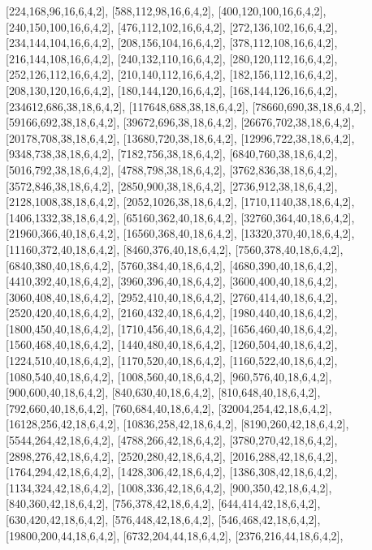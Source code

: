 \documentclass[12pt]{amsart}
\begin{document}
[224,168,96,16,6,4,2],   [588,112,98,16,6,4,2],   [400,120,100,16,6,4,2],   [240,150,100,16,6,4,2],   [476,112,102,16,6,4,2],   [272,136,102,16,6,4,2],
[234,144,104,16,6,4,2],   [208,156,104,16,6,4,2],   [378,112,108,16,6,4,2],   [216,144,108,16,6,4,2],   [240,132,110,16,6,4,2],   [280,120,112,16,6,4,2],
[252,126,112,16,6,4,2],   [210,140,112,16,6,4,2],   [182,156,112,16,6,4,2],   [208,130,120,16,6,4,2],   [180,144,120,16,6,4,2],   [168,144,126,16,6,4,2],
[234612,686,38,18,6,4,2],   [117648,688,38,18,6,4,2],   [78660,690,38,18,6,4,2],   [59166,692,38,18,6,4,2],   [39672,696,38,18,6,4,2],   [26676,702,38,18,6,4,2],
[20178,708,38,18,6,4,2],   [13680,720,38,18,6,4,2],   [12996,722,38,18,6,4,2],   [9348,738,38,18,6,4,2],   [7182,756,38,18,6,4,2],   [6840,760,38,18,6,4,2],
[5016,792,38,18,6,4,2],   [4788,798,38,18,6,4,2],   [3762,836,38,18,6,4,2],   [3572,846,38,18,6,4,2],   [2850,900,38,18,6,4,2],   [2736,912,38,18,6,4,2],
[2128,1008,38,18,6,4,2],   [2052,1026,38,18,6,4,2],   [1710,1140,38,18,6,4,2],   [1406,1332,38,18,6,4,2],   [65160,362,40,18,6,4,2],   [32760,364,40,18,6,4,2],
[21960,366,40,18,6,4,2],   [16560,368,40,18,6,4,2],   [13320,370,40,18,6,4,2],   [11160,372,40,18,6,4,2],   [8460,376,40,18,6,4,2],   [7560,378,40,18,6,4,2],
[6840,380,40,18,6,4,2],   [5760,384,40,18,6,4,2],   [4680,390,40,18,6,4,2],   [4410,392,40,18,6,4,2],   [3960,396,40,18,6,4,2],   [3600,400,40,18,6,4,2],
[3060,408,40,18,6,4,2],   [2952,410,40,18,6,4,2],   [2760,414,40,18,6,4,2],   [2520,420,40,18,6,4,2],   [2160,432,40,18,6,4,2],   [1980,440,40,18,6,4,2],
[1800,450,40,18,6,4,2],   [1710,456,40,18,6,4,2],   [1656,460,40,18,6,4,2],   [1560,468,40,18,6,4,2],   [1440,480,40,18,6,4,2],   [1260,504,40,18,6,4,2],
[1224,510,40,18,6,4,2],   [1170,520,40,18,6,4,2],   [1160,522,40,18,6,4,2],   [1080,540,40,18,6,4,2],   [1008,560,40,18,6,4,2],   [960,576,40,18,6,4,2],
[900,600,40,18,6,4,2],   [840,630,40,18,6,4,2],   [810,648,40,18,6,4,2],   [792,660,40,18,6,4,2],   [760,684,40,18,6,4,2],   [32004,254,42,18,6,4,2],
[16128,256,42,18,6,4,2],   [10836,258,42,18,6,4,2],   [8190,260,42,18,6,4,2],   [5544,264,42,18,6,4,2],   [4788,266,42,18,6,4,2],   [3780,270,42,18,6,4,2],
[2898,276,42,18,6,4,2],   [2520,280,42,18,6,4,2],   [2016,288,42,18,6,4,2],   [1764,294,42,18,6,4,2],   [1428,306,42,18,6,4,2],   [1386,308,42,18,6,4,2],
[1134,324,42,18,6,4,2],   [1008,336,42,18,6,4,2],   [900,350,42,18,6,4,2],   [840,360,42,18,6,4,2],   [756,378,42,18,6,4,2],   [644,414,42,18,6,4,2],
[630,420,42,18,6,4,2],   [576,448,42,18,6,4,2],   [546,468,42,18,6,4,2],   [19800,200,44,18,6,4,2],   [6732,204,44,18,6,4,2],   [2376,216,44,18,6,4,2],
\end{document}
